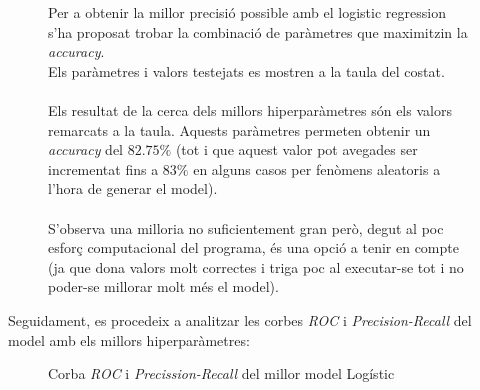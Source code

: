 \documentclass[a4paper, 11pt]{article}
\begin{document}
\begin{figure}[h]
\begin{minipage}{6.5cm}
Per a obtenir la millor precisió possible amb el logistic regression s'ha proposat trobar la combinació de paràmetres que maximitzin la \textit{accuracy}.\\ Els paràmetres i valors testejats es mostren a la taula del costat.\\\\
Els resultat de la cerca dels millors hiperparàmetres són els valors remarcats a la taula. Aquests paràmetres permeten obtenir un \textit{accuracy} del $82.75\%$ (tot i que aquest valor pot avegades ser incrementat fins a $83\%$ en alguns casos per fenòmens aleatoris a l'hora de generar el model).\\\\ 
S'observa una milloria no suficientement gran però, degut al poc esforç computacional del programa, és una opció a tenir en compte (ja que dona valors molt correctes i triga poc al executar-se tot i no poder-se millorar molt més el model).
\end{minipage} %
\end{figure} %
\hspace{-1.6em}Seguidament, es procedeix a analitzar les corbes \textit{ROC} i \textit{Precision-Recall} del model amb els millors hiperparàmetres:\\
\vspace{-2em}
\begin{figure}[h]
\centering
    \caption{Corba \textit{ROC} i \textit{Precission-Recall} del millor model Logístic}
    \label{fig:my_label}
\end{figure}\\
\end{document}
